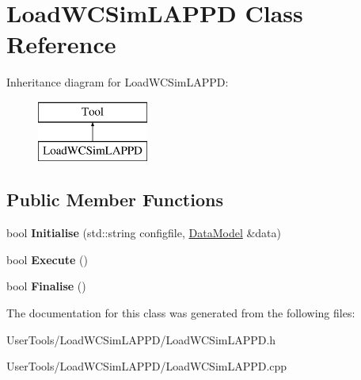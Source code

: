 \hypertarget{classLoadWCSimLAPPD}{\section{Load\-W\-C\-Sim\-L\-A\-P\-P\-D Class Reference}
\label{classLoadWCSimLAPPD}
}
Inheritance diagram for Load\-W\-C\-Sim\-L\-A\-P\-P\-D\-:\begin{figure}[H]
\begin{center}
\leavevmode
\includegraphics[height=2.000000cm]{classLoadWCSimLAPPD}
\end{center}
\end{figure}
\subsection*{Public Member Functions}
\begin{DoxyCompactItemize}
\item 
\hypertarget{classLoadWCSimLAPPD_a1d2069798a83e0f34f41c4112b2343e8}{bool {\bfseries Initialise} (std\-::string configfile, \hyperlink{classDataModel}{Data\-Model} \&data)}\label{classLoadWCSimLAPPD_a1d2069798a83e0f34f41c4112b2343e8}

\item 
\hypertarget{classLoadWCSimLAPPD_a1b41167086f669fc1a71854a360406da}{bool {\bfseries Execute} ()}\label{classLoadWCSimLAPPD_a1b41167086f669fc1a71854a360406da}

\item 
\hypertarget{classLoadWCSimLAPPD_a457044289ecb5a3d18eeb6e8110a3902}{bool {\bfseries Finalise} ()}\label{classLoadWCSimLAPPD_a457044289ecb5a3d18eeb6e8110a3902}

\end{DoxyCompactItemize}


The documentation for this class was generated from the following files\-:\begin{DoxyCompactItemize}
\item 
User\-Tools/\-Load\-W\-C\-Sim\-L\-A\-P\-P\-D/Load\-W\-C\-Sim\-L\-A\-P\-P\-D.\-h\item 
User\-Tools/\-Load\-W\-C\-Sim\-L\-A\-P\-P\-D/Load\-W\-C\-Sim\-L\-A\-P\-P\-D.\-cpp\end{DoxyCompactItemize}
